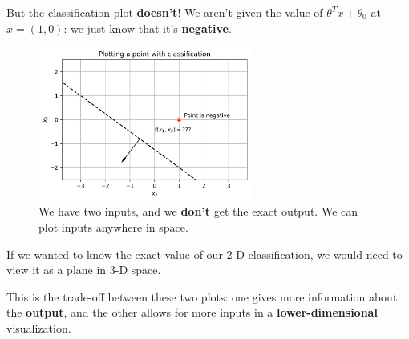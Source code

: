         But the classification plot \textbf{doesn't}! We aren't given the value of $\theta^Tx +\theta_0$ at $x=(1,0)$: we just know that it's \textbf{negative}.
        
        \begin{figure}[H]
            \centering
            
            \includegraphics[width=70mm,scale=0.5]{images/classification_images/2d_classification_plot.png}
            \caption*{We have two inputs, and we \textbf{don't} get the exact output. We can plot inputs anywhere in space.}
        \end{figure}
        
        If we wanted to know the exact value of our 2-D classification, we would need to view it as a plane in 3-D space.
        
        This is the trade-off between these two plots: one gives more information about the \textbf{output}, and the other allows for more inputs in a \textbf{lower-dimensional} visualization.\\
        
